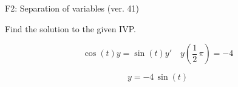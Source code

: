 \begin{exercise}
  \begin{exerciseTitle}F2: Separation of variables (ver. 41)\end{exerciseTitle}
  \begin{exerciseStatement}
    
Find the solution to the given IVP.

    
\[\cos\left(t\right) y= \sin\left(t\right) y'\hspace{1em} y\left( \frac{1}{2} \, \pi \right)= -4\]

  \end{exerciseStatement}
  \begin{exerciseAnswer}
    
\[y= -4 \, \sin\left(t\right)\]

  \end{exerciseAnswer}
\end{exercise}